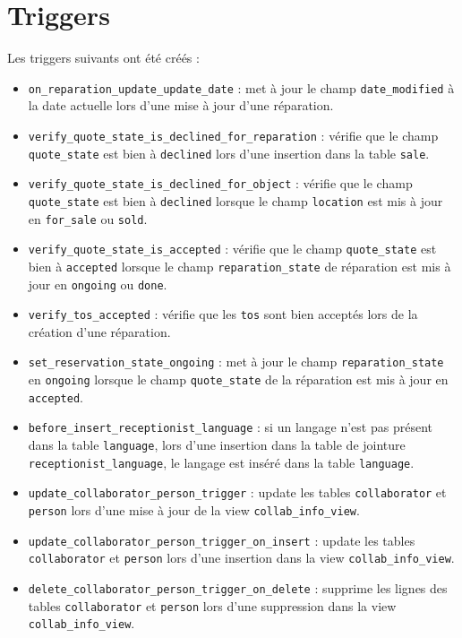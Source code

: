 \documentclass{article}
\newcommand{\ttt}{\texttt}
\begin{document}
    \section{Triggers}

    Les triggers suivants ont été créés :
    \begin{itemize}
        \item \ttt{on\_reparation\_update\_update\_date} : met à jour le champ \ttt{date\_modified} à la date actuelle lors d'une mise à jour d'une réparation.
        \item \ttt{verify\_quote\_state\_is\_declined\_for\_reparation} : vérifie que le champ \ttt{quote\_state} est bien à \ttt{declined} lors d'une insertion dans la table \ttt{sale}.
        \item \ttt{verify\_quote\_state\_is\_declined\_for\_object} : vérifie que le champ \ttt{quote\_state} est bien à \ttt{declined} lorsque le champ \ttt{location} est mis à jour en \ttt{for\_sale} ou \ttt{sold}.
        \item \ttt{verify\_quote\_state\_is\_accepted} : vérifie que le champ \ttt{quote\_state} est bien à \ttt{accepted} lorsque le champ \ttt{reparation\_state} de réparation est mis à jour en \ttt{ongoing} ou \ttt{done}.
        \item \ttt{verify\_tos\_accepted} : vérifie que les \ttt{tos} sont bien acceptés lors de la création d'une réparation.
        \item \ttt{set\_reservation\_state\_ongoing} : met à jour le champ \ttt{reparation\_state} en \ttt{ongoing} lorsque le champ \ttt{quote\_state} de la réparation est mis à jour en \ttt{accepted}.
        \item \ttt{before\_insert\_receptionist\_language} : si un langage n'est pas présent dans la table \ttt{language}, lors d'une insertion dans la table de jointure \ttt{receptionist\_language}, le langage est inséré dans la table \ttt{language}.
        \item \ttt{update\_collaborator\_person\_trigger} : update les tables \ttt{collaborator} et \ttt{person} lors d'une mise à jour de la view \ttt{collab\_info\_view}.
        \item \ttt{update\_collaborator\_person\_trigger\_on\_insert} : update les tables \ttt{collaborator} et \ttt{person} lors d'une insertion dans la view \ttt{collab\_info\_view}.
        \item \ttt{delete\_collaborator\_person_trigger\_on\_delete} : supprime les lignes des tables \ttt{collaborator} et \ttt{person} lors d'une suppression dans la view \ttt{collab\_info\_view}.

\end{itemize}
\end{document}
